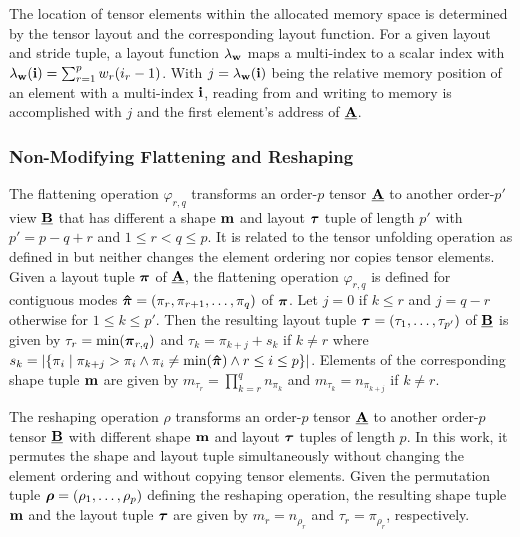 The location of tensor elements within the allocated memory space is determined by the tensor layout and the corresponding layout function.
For a given layout and stride tuple, a layout function $\lambda_{\mathbf{w}}$ maps a multi-index to a scalar index with $\lambda_{\mathbf{w}}(\mathbf{i}) = \sum_{r=1}^p w_r (i_r-1)$.
With $j = \lambda_{\mathbf{w}} (\mathbf{i})$ being the relative memory position of an element with a multi-index $\mathbf{i}$, reading from and writing to memory is accomplished with $j$ and the first element's address of $\underline{\mathbf{A}}$.


\subsubsection{Non-Modifying Flattening and Reshaping}
\label{sec:preliminaries:flattening.reshaping}
The flattening operation $\varphi_{r,q}$ transforms an order-$p$ tensor $\underline{\mathbf{A}}$ to another order-$p'$ view $\underline{\mathbf{B}}$ that has different a shape $\mathbf{m}$ and layout $\boldsymbol{\tau}$ tuple of length $p'$ with $p' = p-q+r$ and $1 \leq r < q \leq p$.
It is related to the tensor unfolding operation as defined in \cite[p.459]{kolda:2009:decompositions} but neither changes the element ordering nor copies tensor elements.
Given a layout tuple $\boldsymbol{\pi}$ of $\underline{\mathbf{A}}$, the flattening operation $\varphi_{r,q}$ is defined for contiguous modes $\boldsymbol{\hat{\pi}} = (\pi_r,\pi_{r+1}, \dots, \pi_{q})$ of $\boldsymbol{\pi}$.
Let $j = 0$ if $k \leq r$ and $j = q-r$ otherwise for $1 \leq k \leq p'$.
Then the resulting layout tuple $\boldsymbol{\tau} = (\tau_1,\dots,\tau_{p'})$ of $\underline{\mathbf{B}}$ is given by $\tau_r = \min(\boldsymbol{\pi}_{r,q})$ and $\tau_{k} = \pi_{k+j} + s_k$ if $k \neq r$ where $s_k = \left| \{ \pi_i \mid \pi_{k+j} > \pi_i \wedge \pi_i \neq \min(\boldsymbol{\hat{\pi}}) \wedge r \leq i \leq p \} \right|$.
Elements of the corresponding shape tuple $\mathbf{m}$ are given by $m_{\tau_r} = \prod_{k=r}^q n_{\pi_k}$ and $m_{\tau_k} = n_{\pi_{k+j}}$ if $k \neq r$.

The reshaping operation $\rho$ transforms an order-$p$ tensor $\underline{\mathbf{A}}$ to another order-$p$ tensor $\underline{\mathbf{B}}$ with different shape $\mathbf{m}$ and layout $\boldsymbol{\tau}$ tuples of length $p$.
In this work, it permutes the shape and layout tuple simultaneously without changing the element ordering and without copying tensor elements.
Given the permutation tuple $\boldsymbol{\rho} = (\rho_1,\dots,\rho_p)$ defining the reshaping operation, the resulting shape tuple $\mathbf{m}$ and the layout tuple $\boldsymbol{\tau}$ are given by $m_r = n_{\rho_r}$ and $\tau_r = \pi_{\rho_r}$, respectively.



